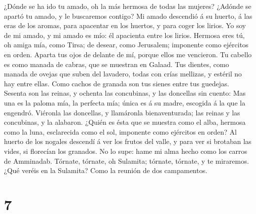  ¿Dónde se ha ido tu amado, oh la más hermosa de todas las
mujeres? ¿Adónde se apartó tu amado, y le buscaremos contigo?
 Mi amado descendió á su huerto, á las eras de los aromas,
para apacentar en los huertos, y para coger los lirios. 
Yo soy de mi amado, y mi amado es mío: él apacienta entre los lirios.
 Hermosa eres tú, oh amiga mía, como Tirsa; de desear,
como Jerusalem; imponente como ejércitos en orden.  Aparta
tus ojos de delante de mí, porque ellos me vencieron. Tu cabello es como
manada de cabras, que se muestran en Galaad.  Tus dientes,
como manada de ovejas que suben del lavadero, todas con crías mellizas,
y estéril no hay entre ellas.  Como cachos de granada son
tus sienes entre tus guedejas.  Sesenta son las reinas, y
ochenta las concubinas, y las doncellas sin cuento:  Mas
una es la paloma mía, la perfecta mía; única es á su madre, escogida á
la que la engendró. Viéronla las doncellas, y llamáronla bienaventurada;
las reinas y las concubinas, y la alabaron.  ¿Quién es
ésta que se muestra como el alba, hermosa como la luna, esclarecida como
el sol, imponente como ejércitos en orden?  Al huerto de
los nogales descendí á ver los frutos del valle, y para ver si brotaban
las vides, si florecían los granados.  No lo supe: hame
mi alma hecho como los carros de Amminadab.  Tórnate,
tórnate, oh Sulamita; tórnate, tórnate, y te miraremos. ¿Qué veréis en
la Sulamita? Como la reunión de dos campamentos.

\hypertarget{section-6}{%
\section{7}\label{section-6}}

